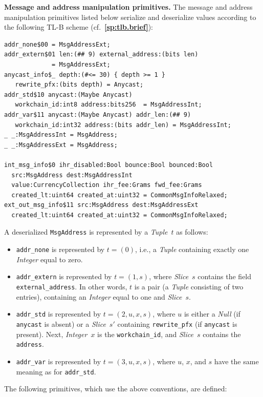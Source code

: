 \documentclass[12pt,oneside]{article}
\def\makepoint#1{\medbreak\noindent{\bf #1.\ }}
\def\nxsubpoint{\refstepcounter{subsubsection}%
  \smallbreak\makepoint{\thesubsubsection}}
\def\refpoint#1{{\rm\textbf{\ref{#1}}}}
\let\ptref=\refpoint
\def\emb#1{\textbf{#1.}}
\begin{document}
\nxsubpoint\emb{Message and address manipulation primitives}
The message and address manipulation primitives listed below serialize and deserialize values according to the following TL-B scheme (cf.~\ptref{sp:tlb.brief}):
\begin{verbatim}
addr_none$00 = MsgAddressExt;
addr_extern$01 len:(## 9) external_address:(bits len) 
             = MsgAddressExt;
anycast_info$_ depth:(#<= 30) { depth >= 1 }
   rewrite_pfx:(bits depth) = Anycast;
addr_std$10 anycast:(Maybe Anycast) 
   workchain_id:int8 address:bits256  = MsgAddressInt;
addr_var$11 anycast:(Maybe Anycast) addr_len:(## 9) 
   workchain_id:int32 address:(bits addr_len) = MsgAddressInt;
_ _:MsgAddressInt = MsgAddress;
_ _:MsgAddressExt = MsgAddress;

int_msg_info$0 ihr_disabled:Bool bounce:Bool bounced:Bool
  src:MsgAddress dest:MsgAddressInt 
  value:CurrencyCollection ihr_fee:Grams fwd_fee:Grams
  created_lt:uint64 created_at:uint32 = CommonMsgInfoRelaxed;
ext_out_msg_info$11 src:MsgAddress dest:MsgAddressExt
  created_lt:uint64 created_at:uint32 = CommonMsgInfoRelaxed;
\end{verbatim}
A deserialized {\tt MsgAddress} is represented by a {\em Tuple\/}~$t$ as follows:
\begin{itemize}
\item {\tt addr\_none} is represented by $t=(0)$, i.e., a {\em Tuple\/} containing exactly one {\em Integer\/} equal to zero.
\item {\tt addr\_extern} is represented by $t=(1,s)$, where {\em Slice\/}~$s$ contains the field {\tt external\_address}. In other words, $t$ is a pair (a {\em Tuple\/} consisting of two entries), containing an {\em Integer\/} equal to one and {\em Slice}~$s$.
\item {\tt addr\_std} is represented by $t=(2,u,x,s)$, where $u$ is either a {\em Null\/} (if {\tt anycast} is absent) or a {\em Slice\/}~$s'$ containing {\tt rewrite\_pfx} (if {\tt anycast} is present). Next, {\em Integer\/}~$x$ is the {\tt workchain\_id}, and {\em Slice\/}~$s$ contains the {\tt address}.
\item {\tt addr\_var} is represented by $t=(3,u,x,s)$, where $u$, $x$, and $s$ have the same meaning as for {\tt addr\_std}.
\end{itemize}
The following primitives, which use the above conventions, are defined:
\end{document}
